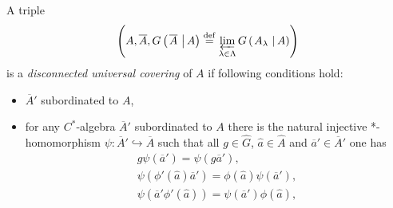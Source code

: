 \documentclass{beamer}
\theoremstyle{plain}
\newcommand{\be}{\begin{equation}}
\newcommand{\ee}{\end{equation}}
\newcommand{\la}{\lambda}
\newcommand{\La}{\Lambda}
\newcommand{\bydef}{\stackrel{\mathrm{def}}{=}}
\newcommand{\hookto}{\hookrightarrow}        %
\begin{document}
\begin{frame}
 \begin{definition}\label{disconnected_infinite_noncommutative_covering_defn}
 	A triple
 	\be\label{disc_triple_eqn}
 \left(A, \overline{A}, G\left(\left.\overline{A}~\right| A\right)\bydef  \varprojlim_{\la\in\La}G\left(\left.A_\la~\right| A\right)\right)
 \ee
	is a \textit{disconnected universal covering} of $A$ if following conditions hold:
\begin{itemize}
	\item $\overline{A}'$ subordinated to	$A$,
	\item  for any $C^*$-algebra $\overline{A}'$ subordinated to	$A$  there is the natural injective *-homomorphism
	$\psi : \overline{A}'\hookto\overline{A}$ such that all
	$g \in \widehat{G}$,  $\widehat a \in \widehat{A}$ and $\overline a' \in \overline{A}'$ one has
	\be\label{disconnected_lim_eqn}
	\begin{split}
		g \psi\left( \overline{a}'\right) = \psi\left(g \overline{a}'\right),\\
		\psi\left(\phi'\left( \widehat  a\right)\overline a'  \right) = 	\phi\left( \widehat  a\right)\psi\left( \overline a'  \right),\\
		\psi\left(\overline a' \phi'\left( \widehat  a\right) \right) = 	\psi\left( \overline a'  \right)\phi\left( \widehat  a\right),
	\end{split}
	\ee
\end{itemize}	

\end{definition}
\end{frame}
\end{document}
